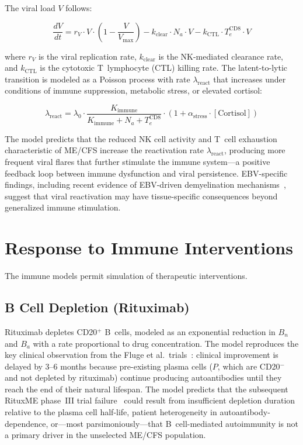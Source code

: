 The viral load $V$ follows:

\begin{equation}
\label{eq:viral-dynamics}
\frac{dV}{dt} = r_V \cdot V \cdot \left(1 - \frac{V}{V_{\max}}\right) - k_{\text{clear}} \cdot N_a \cdot V - k_{\text{CTL}} \cdot T_e^{\text{CD8}} \cdot V
\end{equation}

where $r_V$ is the viral replication rate, $k_{\text{clear}}$ is the NK-mediated clearance rate, and $k_{\text{CTL}}$ is the cytotoxic T~lymphocyte (CTL) killing rate. The latent-to-lytic transition is modeled as a Poisson process with rate $\lambda_{\text{react}}$ that increases under conditions of immune suppression, metabolic stress, or elevated cortisol:

\begin{equation}
\label{eq:reactivation-rate}
\lambda_{\text{react}} = \lambda_0 \cdot \frac{K_{\text{immune}}}{K_{\text{immune}} + N_a + T_e^{\text{CD8}}} \cdot \left(1 + \alpha_{\text{stress}} \cdot [\text{Cortisol}]\right)
\end{equation}

The model predicts that the reduced NK cell activity and T~cell exhaustion characteristic of ME/CFS increase the reactivation rate $\lambda_{\text{react}}$, producing more frequent viral flares that further stimulate the immune system---a positive feedback loop between immune dysfunction and viral persistence. EBV-specific findings, including recent evidence of EBV-driven demyelination mechanisms~\cite{Pless2026ebv_demyelination}, suggest that viral reactivation may have tissue-specific consequences beyond generalized immune stimulation.

\section{Response to Immune Interventions}
\label{sec:immune-intervention-models}

The immune models permit simulation of therapeutic interventions.

\subsection{B Cell Depletion (Rituximab)}

Rituximab depletes CD20$^+$ B~cells, modeled as an exponential reduction in $B_n$ and $B_a$ with a rate proportional to drug concentration. The model reproduces the key clinical observation from the Fluge et al.\ trials~\cite{Fluge2011rituximab,Fluge2015rituximab_rct}: clinical improvement is delayed by 3--6 months because pre-existing plasma cells ($P$, which are CD20$^-$ and not depleted by rituximab) continue producing autoantibodies until they reach the end of their natural lifespan. The model predicts that the subsequent RituxME phase~III trial failure~\cite{Fluge2019} could result from insufficient depletion duration relative to the plasma cell half-life, patient heterogeneity in autoantibody-dependence, or---most parsimoniously---that B~cell-mediated autoimmunity is not a primary driver in the unselected ME/CFS population.

